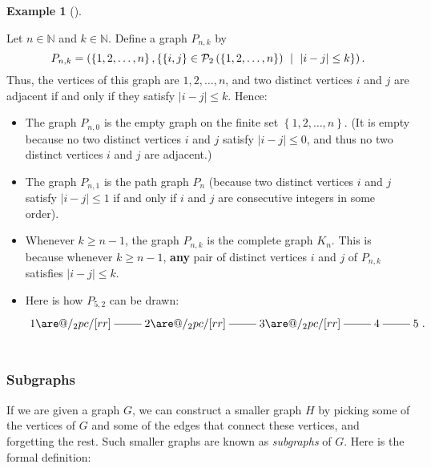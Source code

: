\documentclass[numbers=enddot,12pt,final,onecolumn,notitlepage]{scrartcl}%
\makeatletter
\theoremstyle{definition}
\newtheorem{exam}[theo]{Example}
\newenvironment{example}[1][]
{\begin{exam}[#1]\begin{leftbar}}
{\end{leftbar}\end{exam}}
\newcommand{\NN}{\mathbb{N}}
\newcommand{\powset}[2][]{\ifthenelse{\equal{#2}{}}{\mathcal{P}\left(#1\right)}{\mathcal{P}_{#1}\left(#2\right)}}
\newcommand{\set}[1]{\left\{ #1 \right\}}
\newcommand{\abs}[1]{\left| #1 \right|}
\newcommand{\tup}[1]{\left( #1 \right)}
\newcommand{\are}{\ar@{-}}
\makeatother
\begin{document}
\begin{example} \label{exa.intro.interval-graph-easy}
Let $n \in \NN$ and $k \in \NN$. Define a graph $P_{n, k}$ by
\[
P_{n, k}
= \tup{\set{1, 2, \ldots, n},
       \set{ \set{i, j} \in \powset[2]{\set{1, 2, \ldots, n}} \ \mid
             \  \abs{i-j} \leq k }} .
\]
Thus, the vertices of this graph are $1, 2, \ldots, n$, and two
distinct vertices $i$ and $j$ are adjacent if and only if they
satisfy $\abs{i-j} \leq k$. Hence:
\begin{itemize}
\item The graph $P_{n, 0}$ is the empty graph on the finite set
      $\set{1, 2, \ldots, n}$. (It is empty because no two distinct
      vertices $i$ and $j$ satisfy $\abs{i-j} \leq 0$, and thus no
      two distinct vertices $i$ and $j$ are adjacent.)
\item The graph $P_{n, 1}$ is the path graph $P_n$ (because two
      distinct vertices $i$ and $j$ satisfy $\abs{i-j} \leq 1$ if and
      only if $i$ and $j$ are consecutive integers in some order).
\item Whenever $k \geq n-1$, the graph $P_{n, k}$ is the complete
      graph $K_n$. This is because whenever $k \geq n-1$,
      \textbf{any} pair of distinct vertices $i$ and $j$ of
      $P_{n, k}$ satisfies $\abs{i-j} \leq k$.
\item Here is how $P_{5, 2}$ can be drawn:
      \begin{align*}
      \xymatrix{ 1 \are[r] \are@/_2pc/[rr] & 2 \are[r] \are@/_2pc/[rr] & 3 \are[r] \are@/_2pc/[rr] & 4 \are[r] & 5 } . \\
      \phantom{a} %
      \end{align*}
\end{itemize}

\end{example}

\subsubsection{Subgraphs}

If we are given a graph $G$, we can construct a smaller graph
$H$ by picking some of the vertices of $G$ and some of the
edges that connect these vertices, and forgetting the rest.
Such smaller graphs are known as \textit{subgraphs} of $G$.
Here is the formal definition:
\end{document}
